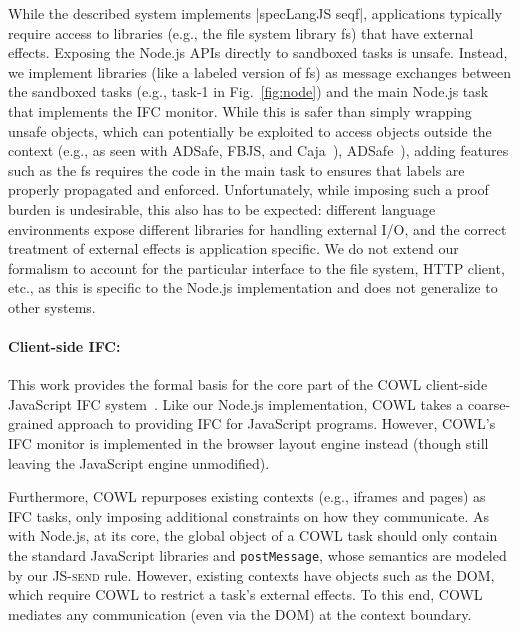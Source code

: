 While the described system implements |specLangJS seqf|, applications
typically require access to libraries (e.g., the file system library
\textsf{fs}) that have external effects.
%
Exposing the Node.js APIs directly to sandboxed tasks is unsafe.
Instead, we implement libraries (like a labeled version of \textsf{fs}) as
message exchanges between the sandboxed tasks (e.g., \textsf{task-1}
in Fig.~\ref{fig:node}) and the main Node.js task that implements
the IFC monitor.
%
While this is safer than simply wrapping unsafe objects, which can
potentially be exploited to access objects outside the context (e.g.,
as seen with
\ifextended
ADSafe, FBJS, and Caja~\cite{taly2011automated, maffeis2010object, maffeis2009language}),
\else
ADSafe~\cite{taly2011automated}),
\fi
adding features such as the
\textsf{fs} requires the code in the main task to ensures that labels
are properly propagated and enforced.
%
Unfortunately, while imposing such a proof burden
is undesirable, this also has to be expected:
different language environments expose different libraries for
handling external I/O, and the correct treatment of external effects
is application specific.
%
%
%
We do not extend our formalism to account for the  particular
interface to the file system, HTTP client, etc., as this is
specific to the Node.js implementation and does not generalize
to other systems.


\paragraph{Client-side IFC:}
This work provides the formal basis for the core part of the COWL
client-side JavaScript IFC system~\cite{swapi}.
%
Like our Node.js implementation, COWL takes a coarse-grained approach
to providing IFC for JavaScript programs.
%
However, COWL's IFC monitor is implemented in
the browser layout engine instead (though still leaving the JavaScript engine
unmodified).

Furthermore, COWL repurposes existing contexts (e.g., iframes and
pages) as IFC tasks, only imposing additional constraints on how they
communicate.
%
As with Node.js, at its core, the global object of a COWL task
should only contain the standard JavaScript libraries and
\texttt{postMessage}, whose semantics are modeled by our
\textsc{JS-send} rule.
%
However, existing contexts have objects such as the DOM, which
require COWL to restrict a task's external effects.
%
To this end, COWL mediates any communication (even via the DOM) at
the context boundary. %

